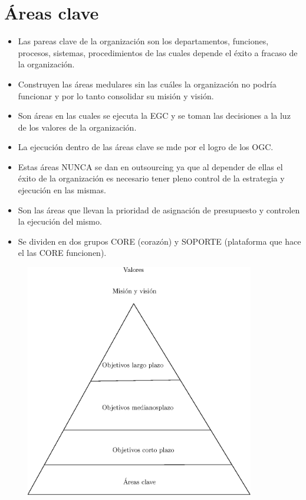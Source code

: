\section{Áreas clave}
\begin{itemize}
    \item Las pareas clave de la organización son los departamentos, funciones, procesos, sistemas, procedimientos de las cuales depende el éxito a fracaso de la organización. 
    \item Construyen las áreas medulares sin las cuáles la organización no podría funcionar y por lo tanto consolidar su misión y visión. 
    \item Son áreas en las cuales se ejecuta la EGC y se toman las decisiones a la luz de los valores de la organización.
    \item La ejecución dentro de las áreas clave se mde por el logro de los OGC. 
    \item Estas áreas NUNCA se dan en outsourcing ya que al depender de ellas el éxito de la organización es necesario tener pleno control de la estrategia y ejecución en las mismas.
    \item Son las áreas que llevan la prioridad de asignación de presupuesto y controlen la ejecución del mismo. 
    \item Se dividen en dos grupos CORE (corazón) y SOPORTE (plataforma que hace el las CORE funcionen).
\end{itemize}
\begin{center}
   \begin{figure}
       \centering
       \includegraphics[width=10cm]{./Clases/figs/01}
   \end{figure}
\end{center}
